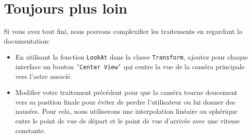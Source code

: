 \documentclass[a4paper,10pt]{article}
\begin{document}
\section{Toujours plus loin}

Si vous avez tout fini, nous pouvons complexifier les traitements en regardant la documentation:
\begin{itemize}
	\item En utilisant la fonction \texttt{LookAt} dans la classe \texttt{Transform}, ajoutez pour chaque interface un bouton \texttt{'Center View'} qui centre la vue de la caméra principale vers l'astre associé.
	\item Modifier votre traitement précédent pour que la caméra tourne doucement vers sa position finale pour éviter de perdre l'utilisateur ou lui donner des nausées. Pour cela, nous utiliserons une interpolation linéaire ou sphérique  entre le point de vue de départ et le point de vue d'arrivée avec une vitesse constante.
\end{itemize}
\end{document}
